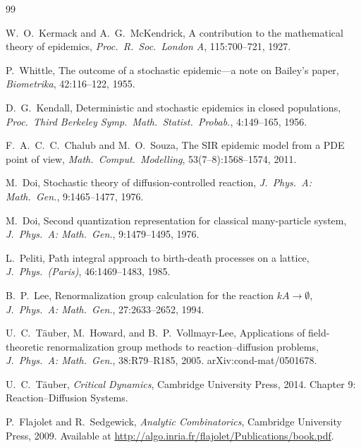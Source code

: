 \documentclass[11pt,a4paper]{article}
\theoremstyle{definition}
\begin{document}
\clearpage

\begin{thebibliography}{99}

W.\ O.\ Kermack and A.\ G.\ McKendrick,
\newblock A contribution to the mathematical theory of epidemics,
\newblock \emph{Proc.\ R.\ Soc.\ London A}, 115:700--721, 1927.

P.\ Whittle,
\newblock The outcome of a stochastic epidemic---a note on Bailey's paper,
\newblock \emph{Biometrika}, 42:116--122, 1955.

D.\ G.\ Kendall,
\newblock Deterministic and stochastic epidemics in closed populations,
\newblock \emph{Proc.\ Third Berkeley Symp.\ Math.\ Statist.\ Probab.},
  4:149--165, 1956.

F.\ A.\ C.\ C.\ Chalub and M.\ O.\ Souza,
\newblock The {SIR} epidemic model from a {PDE} point of view,
\newblock \emph{Math.\ Comput.\ Modelling}, 53(7--8):1568--1574, 2011.

M.\ Doi,
\newblock Stochastic theory of diffusion-controlled reaction,
\newblock \emph{J.\ Phys.\ A: Math.\ Gen.}, 9:1465--1477, 1976.

M.\ Doi,
\newblock Second quantization representation for classical many-particle system,
\newblock \emph{J.\ Phys.\ A: Math.\ Gen.}, 9:1479--1495, 1976.

L.\ Peliti,
\newblock Path integral approach to birth-death processes on a lattice,
\newblock \emph{J.\ Phys.\ (Paris)}, 46:1469--1483, 1985.

B.\ P.\ Lee,
\newblock Renormalization group calculation for the reaction $kA\to\emptyset$,
\newblock \emph{J.\ Phys.\ A: Math.\ Gen.}, 27:2633--2652, 1994.

U.\ C.\ T\"auber, M.\ Howard, and B.\ P.\ Vollmayr-Lee,
\newblock Applications of field-theoretic renormalization group methods to
  reaction--diffusion problems,
\newblock \emph{J.\ Phys.\ A: Math.\ Gen.}, 38:R79--R185, 2005.
\newblock arXiv:cond-mat/0501678.

U.\ C.\ T\"auber,
\newblock \emph{Critical Dynamics},
\newblock Cambridge University Press, 2014.
\newblock Chapter 9: Reaction--Diffusion Systems.

P.\ Flajolet and R.\ Sedgewick,
\newblock \emph{Analytic Combinatorics},
\newblock Cambridge University Press, 2009.
\newblock Available at \url{http://algo.inria.fr/flajolet/Publications/book.pdf}.


\end{thebibliography}
\end{document}
